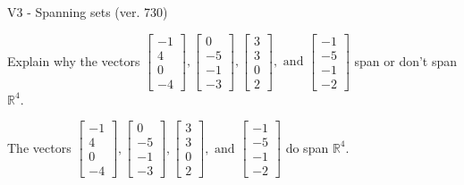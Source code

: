 \begin{exercise}
  \begin{exerciseTitle}V3 - Spanning sets (ver. 730)\end{exerciseTitle}
  \begin{exerciseStatement}
    Explain why the vectors \(\left[\begin{array}{r}
-1 \\
4 \\
0 \\
-4
\end{array}\right] , \left[\begin{array}{r}
0 \\
-5 \\
-1 \\
-3
\end{array}\right] , \left[\begin{array}{r}
3 \\
3 \\
0 \\
2
\end{array}\right] , \text{ and } \left[\begin{array}{r}
-1 \\
-5 \\
-1 \\
-2
\end{array}\right]\) span or don't span \(\mathbb{R}^4\). 
	


  \end{exerciseStatement}
  \begin{exerciseAnswer}
   The vectors \(\left[\begin{array}{r}
-1 \\
4 \\
0 \\
-4
\end{array}\right] , \left[\begin{array}{r}
0 \\
-5 \\
-1 \\
-3
\end{array}\right] , \left[\begin{array}{r}
3 \\
3 \\
0 \\
2
\end{array}\right] , \text{ and } \left[\begin{array}{r}
-1 \\
-5 \\
-1 \\
-2
\end{array}\right]\) 
  	 do  
	span \(\mathbb{R}^4\).
  


  \end{exerciseAnswer}
\end{exercise}